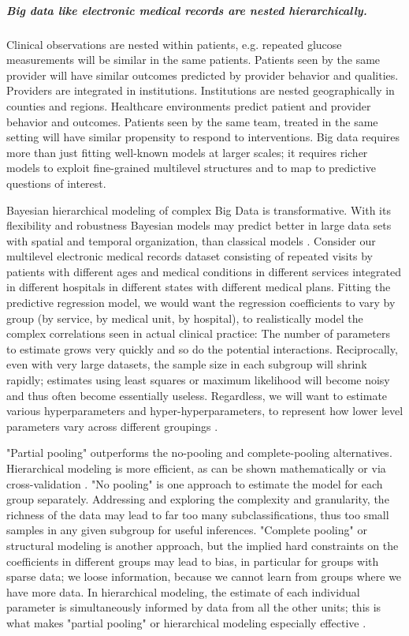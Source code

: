 \documentclass[11pt,notitlepage]{article}
\begin{document}
\subparagraph{Big data like electronic medical records are nested hierarchically.}
Clinical observations are nested within patients, e.g. repeated glucose measurements will be similar in the same patients. Patients seen by the same provider will have similar outcomes predicted by provider behavior and qualities. Providers are integrated in institutions. Institutions are nested geographically in counties and regions. Healthcare environments predict patient and provider behavior and outcomes. Patients seen by the same team, treated in the same setting will have similar propensity to respond to interventions. Big data requires more than just fitting well-known models at larger scales; it requires richer models to exploit fine-grained multilevel structures and to map to predictive questions of interest.

Bayesian hierarchical modeling of complex Big Data is transformative.
With its flexibility and robustness Bayesian models may predict better in large data sets with spatial and temporal organization, than classical models \cite{Gelman_red_2009}.  Consider our multilevel electronic medical records dataset consisting of repeated visits by patients with different ages and medical conditions in different services integrated in different hospitals in different states with different medical plans. Fitting the predictive regression model, we would want the regression coefficients to vary by group (by service, by medical unit, by hospital), to realistically model the complex correlations seen in actual clinical practice: The number of parameters to estimate grows very quickly and so do the potential interactions. Reciprocally, even with very large datasets, the sample size in each subgroup will shrink rapidly; estimates using least squares or maximum likelihood will become noisy and thus often become essentially useless. Regardless, we  will want to estimate various hyperparameters and hyper-hyperparameters, to represent how lower level parameters vary across different groupings \cite{Bafumi_Gelman_2007}.

"Partial pooling" outperforms the no-pooling and complete-pooling alternatives.
Hierarchical modeling is more efficient, as can be shown mathematically or via cross-validation \cite{Gelman-Hill_2014}. "No pooling" is one approach to estimate the model for each group separately. Addressing and exploring the complexity and granularity, the richness of the data may lead to far too many subclassifications, thus too small samples in any given subgroup for useful inferences. "Complete pooling" or structural modeling is another approach, but the implied hard constraints on the coefficients in different groups may lead to bias, in particular for groups with sparse data; we loose information, because we cannot learn from groups where we have more data. In hierarchical modeling, the estimate of each individual parameter is simultaneously informed by data from all the other units; this is what makes "partial pooling" or hierarchical modeling especially effective \cite{Gelman_multilevel_2006}. 
\end{document}
